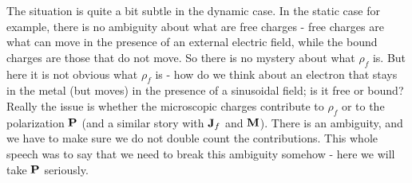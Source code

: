 The situation is quite a bit subtle in the dynamic case. In the static case for example, there is no ambiguity about what are free charges - free charges are what can move in the presence of an external electric field, while the bound charges are those that do not move. So there is no mystery about what $\rho_f$ is. But here it is not obvious what $\rho_f$ is - how do we think about an electron that stays in the metal (but moves) in the presence of a sinusoidal field; is it free or bound? Really the issue is whether the microscopic charges contribute to $\rho_f$ or to the polarization $\mathbf{P}$ (and a similar story with $\mathbf{J}_f$ and $\mathbf{M}$). There is an ambiguity, and we have to make sure we do not double count the contributions. This whole speech was to say that we need to break this ambiguity somehow - here we will take $\mathbf{P}$ seriously.

